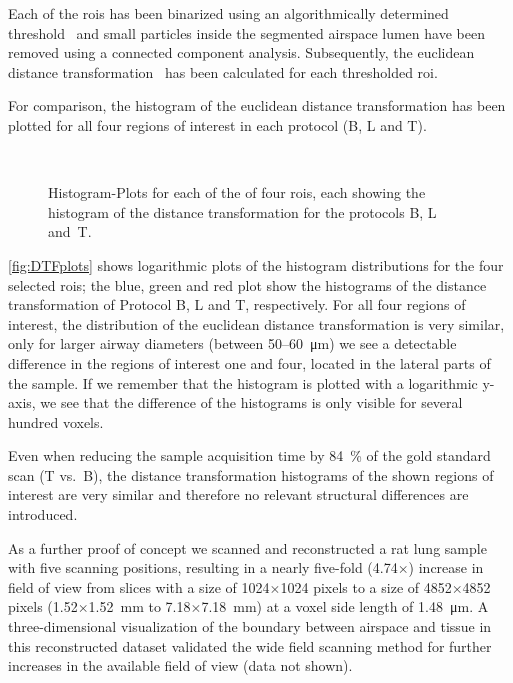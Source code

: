 Each of the \acp{roi} has been binarized using an algorithmically determined threshold~\cite{Otsu1979} and small particles inside the segmented airspace lumen have been removed using a connected component analysis. Subsequently, the euclidean distance transformation~\cite{Danielsson1980} has been calculated for each thresholded \ac{roi}.

For comparison, the histogram of the euclidean distance transformation has been plotted for all four regions of interest in each protocol (B, L and T).

\renewcommand{\imsize}{0.705\linewidth}%
\begin{figure}[htb]%
	\noindent\makebox[\textwidth]{%
		\subfloat{}%
		\hspace{3mm}%
		\subfloat{}%
	}%
	\\%
	\noindent\makebox[\textwidth]{%
		\subfloat{}%
		\hspace{3mm}%
		\subfloat{}%
	}%
	\caption[Histogram-Plots]{Histogram-Plots for each of the of four \acp{roi}, each showing the histogram of the distance transformation for the protocols B, L and~T.}%
	\label{fig:DTFplots}
\end{figure}%

\autoref{fig:DTFplots} shows logarithmic plots of the histogram distributions for the four selected \acp{roi}; the blue, green and red plot show the histograms of the distance transformation of Protocol B, L and T, respectively. For all four regions of interest, the distribution of the euclidean distance transformation is very similar, only for larger airway diameters (between 50--\SI{60}{\micro\meter}) we see a detectable difference in the regions of interest one and four, located in the lateral parts of the sample. If we remember that the histogram is plotted with a logarithmic y-axis, we see that the difference of the histograms is only visible for several hundred voxels.

Even when reducing the sample acquisition time by \SI{84}{\percent} of the gold standard scan (T vs.\ B), the distance transformation histograms of the shown regions of interest are very similar and therefore no relevant structural differences are introduced.

As a further proof of concept we scanned and reconstructed a rat lung sample with five scanning positions, resulting in a nearly five-fold (4.74$\times$) increase in field of view from slices with a size of 1024$\times$1024 pixels to a size of 4852$\times$4852 pixels (1.52$\times$\SI{1.52}{\milli\meter} to 7.18$\times$\SI{7.18}{\milli\meter}) at a voxel side length of \SI{1.48}{\micro\meter}. A three-dimensional visualization of the boundary between airspace and tissue in this reconstructed dataset validated the wide field scanning method for further increases in the available field of view (data not shown).

